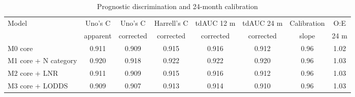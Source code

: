 \begin{table}[htbp]
\caption{Prognostic discrimination and 24-month calibration}\label{tab:prognostic}
\footnotesize
\begin{tabular*}{\textwidth}{@{\extracolsep{\fill}}lccccccc@{}}
\toprule
Model & Uno's C & Uno's C & Harrell's C & tdAUC 12 m & tdAUC 24 m & Calibration & O:E \\
 & apparent & corrected & corrected & corrected & corrected & slope & 24 m \\
\midrule
M0 core & 0.911 & 0.909 & 0.915 & 0.916 & 0.912 & 0.96 & 1.02 \\
M1 core + N category & 0.920 & 0.918 & 0.922 & 0.922 & 0.920 & 0.96 & 1.03 \\
M2 core + LNR & 0.911 & 0.909 & 0.915 & 0.916 & 0.912 & 0.96 & 1.03 \\
M3 core + LODDS & 0.909 & 0.907 & 0.913 & 0.914 & 0.910 & 0.96 & 1.03 \\
\bottomrule
\end{tabular*}
\smallskip{}
\end{table}
